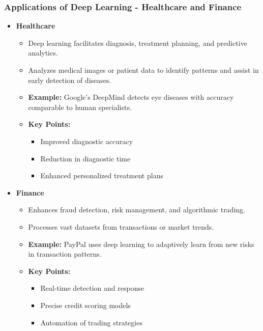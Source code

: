 \documentclass[aspectratio=169]{beamer}
\begin{document}
\begin{frame}[fragile]
    \frametitle{Applications of Deep Learning - Healthcare and Finance}
    \begin{itemize}
        \item \textbf{Healthcare}
        \begin{itemize}
            \item Deep learning facilitates diagnosis, treatment planning, and predictive analytics.
            \item Analyzes medical images or patient data to identify patterns and assist in early detection of diseases.
            \item \textbf{Example:} Google's DeepMind detects eye diseases with accuracy comparable to human specialists.
            \item \textbf{Key Points:}
                \begin{itemize}
                    \item Improved diagnostic accuracy
                    \item Reduction in diagnostic time
                    \item Enhanced personalized treatment plans
                \end{itemize}
        \end{itemize}
        
        \item \textbf{Finance}
        \begin{itemize}
            \item Enhances fraud detection, risk management, and algorithmic trading.
            \item Processes vast datasets from transactions or market trends.
            \item \textbf{Example:} PayPal uses deep learning to adaptively learn from new risks in transaction patterns.
            \item \textbf{Key Points:}
                \begin{itemize}
                    \item Real-time detection and response
                    \item Precise credit scoring models
                    \item Automation of trading strategies
                \end{itemize}
        \end{itemize}
    \end{itemize}
\end{frame}
\end{document}
